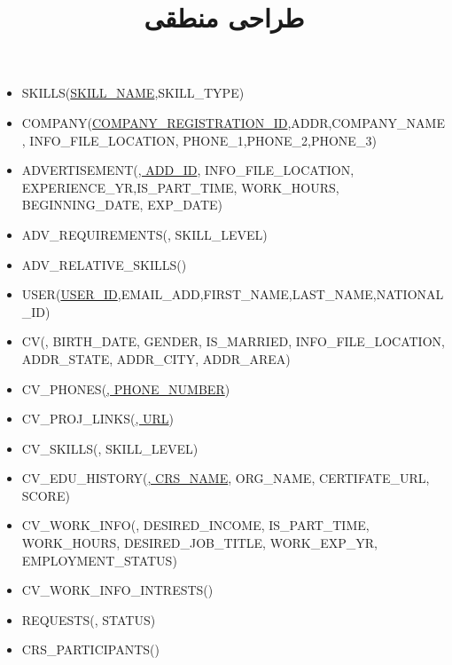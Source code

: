 \documentclass{article}
\title{طراحی منطقی}
\date{}
\begin{document}
\maketitle
\begin{flushleft}
    
    \begin{latin}
        \begin{itemize}
            \item SKILLS(\underline{SKILL\_NAME},SKILL\_TYPE)
            \item COMPANY(\underline{COMPANY\_REGISTRATION\_ID},ADDR,COMPANY\_NAME, INFO\_FILE\_LOCATION, PHONE\_1,PHONE\_2,PHONE\_3)
            \item ADVERTISEMENT(\underline{, ADD\_ID}, INFO\_FILE\_LOCATION, EXPERIENCE\_YR,IS\_PART\_TIME, WORK\_HOURS, BEGINNING\_DATE, EXP\_DATE)
            \item ADV\_REQUIREMENTS(\underline{}, SKILL\_LEVEL)
            \item ADV\_RELATIVE\_SKILLS(\underline{})
            \item USER(\underline{USER\_ID},EMAIL\_ADD,FIRST\_NAME,LAST\_NAME,NATIONAL\_ID)
            \item CV(\underline{}, BIRTH\_DATE, GENDER, IS\_MARRIED, INFO\_FILE\_LOCATION, ADDR\_STATE, ADDR\_CITY, ADDR\_AREA)
            \item CV\_PHONES(\underline{, PHONE\_NUMBER})
            \item CV\_PROJ\_LINKS(\underline{, URL})
            \item CV\_SKILLS(\underline{}, SKILL\_LEVEL)
            \item CV\_EDU\_HISTORY(\underline{, CRS\_NAME}, ORG\_NAME, CERTIFATE\_URL, SCORE)
            \item CV\_WORK\_INFO(\underline{}, DESIRED\_INCOME, IS\_PART\_TIME, WORK\_HOURS, DESIRED\_JOB\_TITLE, WORK\_EXP\_YR, EMPLOYMENT\_STATUS)
            \item CV\_WORK\_INFO\_INTRESTS(\underline{})
            \item REQUESTS(\underline{}, STATUS)
            \item CRS\_PARTICIPANTS(\underline{})

\end{itemize}
\end{latin}
\end{flushleft}
\end{document}
